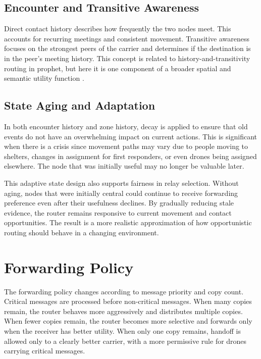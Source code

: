 \subsection{Encounter and Transitive Awareness}
Direct contact history describes how frequently the two nodes meet. This accounts for recurring meetings and consistent movement. Transitive awareness focuses on the strongest peers of the carrier and determines if the destination is in the peer’s meeting history. This concept is related to history-and-transitivity routing in \ac{prophet}, but here it is one component of a broader spatial and semantic utility function \citep{lindgren2012prophet}.

\subsection{State Aging and Adaptation}
In both encounter history and zone history, decay is applied to ensure that old events do not have an overwhelming impact on current actions. This is significant when there is a crisis since movement paths may vary due to people moving to shelters, changes in assignment for first responders, or even drones being assigned elsewhere. The node that was initially useful may no longer be valuable later.

This adaptive state design also supports fairness in relay selection. Without aging, nodes that were initially central could continue to receive forwarding preference even after their usefulness declines. By gradually reducing stale evidence, the router remains responsive to current movement and contact opportunities. The result is a more realistic approximation of how opportunistic routing should behave in a changing environment.

\section{Forwarding Policy}
The forwarding policy changes according to message priority and copy count. Critical messages are processed before non-critical messages. When many copies remain, the router behaves more aggressively and distributes multiple copies. When fewer copies remain, the router becomes more selective and forwards only when the receiver has better utility. When only one copy remains, handoff is allowed only to a clearly better carrier, with a more permissive rule for drones carrying critical messages.

